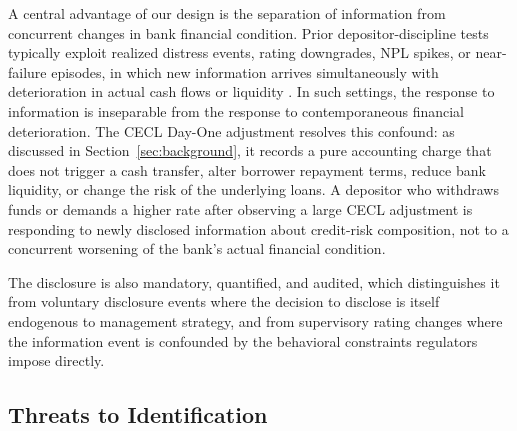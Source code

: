 A central advantage of our design is the separation of information from
concurrent changes in bank financial condition.  Prior depositor-discipline
tests typically exploit realized distress events, rating downgrades, NPL
spikes, or near-failure episodes, in which new information arrives
simultaneously with deterioration in actual cash flows or liquidity
\citep{flannery1996evidence, martinez2001depositors, iyer2016tale}.
In such settings, the response to information is inseparable from the
response to contemporaneous financial deterioration.  The CECL Day-One
adjustment resolves this confound: as discussed in
Section~\ref{sec:background}, it records a pure accounting charge that does
not trigger a cash transfer, alter borrower repayment terms, reduce bank
liquidity, or change the risk of the underlying loans.  A depositor who
withdraws funds or demands a higher rate after observing a large CECL
adjustment is responding to newly disclosed information about credit-risk
composition, not to a concurrent worsening of the bank's actual financial
condition.

The disclosure is also mandatory, quantified, and audited, which distinguishes
it from voluntary disclosure events where the decision to disclose is itself
endogenous to management strategy, and from supervisory rating changes where
the information event is confounded by the behavioral constraints regulators
impose directly.

\subsection{Threats to Identification}
\label{sec:identification:threats}


